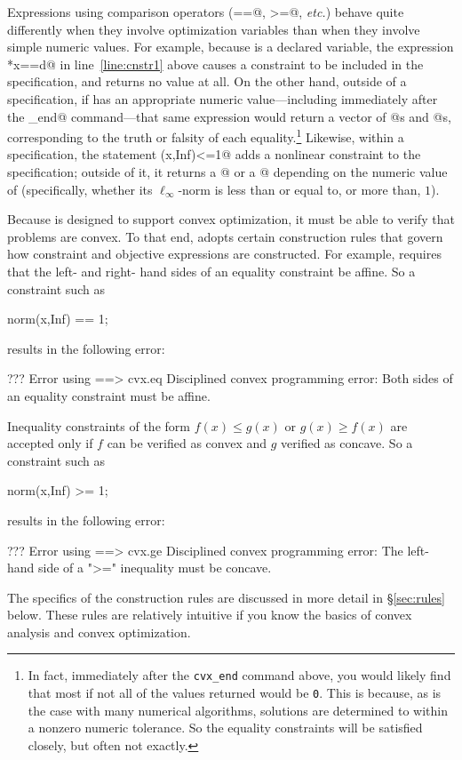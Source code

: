 \documentclass[12pt]{article}
\begin{document}
Expressions using comparison operators (\verb@==@, \verb@>=@, \emph{etc.})
behave quite differently when they involve \cvx optimization variables
than when they involve simple numeric values. For example, because \verb@x@
is a declared variable, the expression \verb@C*x==d@ in line~\ref{line:cnstr1}
above causes a constraint to be included in the \cvx specification,
and returns no value at all. 
On the other hand, outside of a \cvx specification,
if \verb@x@ has an appropriate numeric value---including immediately after
the \verb@cvx_end@ command---that same expression would return a vector of
@s and @s, corresponding to the truth or falsity of each 
equality.\footnote{In fact, immediately after the
\texttt{cvx\_end} command above, you would likely find that most if not
all of the values returned would be \texttt{0}. This
is because, as is the case with many numerical algorithms, solutions 
are determined to within a nonzero numeric tolerance. So the equality constraints
will be satisfied closely, but often not exactly.} Likewise, within
a \cvx specification, the statement \verb@norm(x,Inf)<=1@ adds a
nonlinear constraint to the specification; outside of it, it
returns a @ or a @ depending on the numeric value 
of \verb@x@ (specifically, whether its $\ell_\infty$-norm
is less than or equal to, or more than, $1$).

Because \cvx is designed to support convex optimization, it must be
able to verify that problems are convex. To that end,
\cvx adopts certain construction rules
that govern how constraint and objective expressions are constructed.
For example, \cvx requires that the left- and right- hand sides of an
equality constraint be affine. So a constraint such as
\begin{code}
	norm(x,Inf) == 1;
\end{code}
results in the following error:
\begin{code}
??? Error using ==> cvx.eq
Disciplined convex programming error:
Both sides of an equality constraint must be affine.
\end{code}
Inequality constraints of the form $f(x) \leq g(x)$
or $g(x) \geq f(x)$
are accepted only if $f$ can be verified as convex and $g$
verified as concave. So a constraint such as
\begin{code}
	norm(x,Inf) >= 1;
\end{code}
results in the following error:
\begin{code}
??? Error using ==> cvx.ge
Disciplined convex programming error:
The left-hand side of a ">=" inequality must be concave.
\end{code}
The specifics of the construction rules are discussed in
more detail in \S\ref{sec:rules} below.  
These rules are relatively intuitive if you know the basics of
convex analysis and convex optimization.
\end{document}
